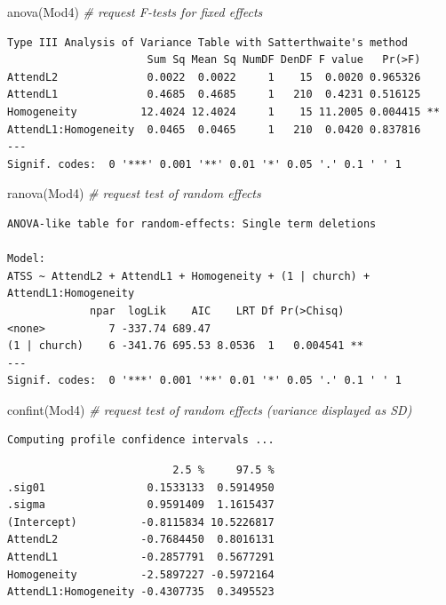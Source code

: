 \documentclass[
  11pt,
]{book}
\newenvironment{Shaded}{\begin{snugshade}}{\end{snugshade}}
\newcommand{\CommentTok}[1]{\textcolor[rgb]{0.56,0.35,0.01}{\textit{#1}}}
\newcommand{\FunctionTok}[1]{\textcolor[rgb]{0.00,0.00,0.00}{#1}}
\newcommand{\NormalTok}[1]{#1}
\begin{document}
\begin{Shaded}
\begin{Highlighting}[]
\FunctionTok{anova}\NormalTok{(Mod4) }\CommentTok{\# request F{-}tests for fixed effects}
\end{Highlighting}
\end{Shaded}

\begin{verbatim}
Type III Analysis of Variance Table with Satterthwaite's method
                      Sum Sq Mean Sq NumDF DenDF F value   Pr(>F)   
AttendL2              0.0022  0.0022     1    15  0.0020 0.965326   
AttendL1              0.4685  0.4685     1   210  0.4231 0.516125   
Homogeneity          12.4024 12.4024     1    15 11.2005 0.004415 **
AttendL1:Homogeneity  0.0465  0.0465     1   210  0.0420 0.837816   
---
Signif. codes:  0 '***' 0.001 '**' 0.01 '*' 0.05 '.' 0.1 ' ' 1
\end{verbatim}

\begin{Shaded}
\begin{Highlighting}[]
\FunctionTok{ranova}\NormalTok{(Mod4) }\CommentTok{\# request test of random effects}
\end{Highlighting}
\end{Shaded}

\begin{verbatim}
ANOVA-like table for random-effects: Single term deletions

Model:
ATSS ~ AttendL2 + AttendL1 + Homogeneity + (1 | church) + AttendL1:Homogeneity
             npar  logLik    AIC    LRT Df Pr(>Chisq)   
<none>          7 -337.74 689.47                        
(1 | church)    6 -341.76 695.53 8.0536  1   0.004541 **
---
Signif. codes:  0 '***' 0.001 '**' 0.01 '*' 0.05 '.' 0.1 ' ' 1
\end{verbatim}

\begin{Shaded}
\begin{Highlighting}[]
\FunctionTok{confint}\NormalTok{(Mod4) }\CommentTok{\# request test of random effects (variance displayed as SD)}
\end{Highlighting}
\end{Shaded}

\begin{verbatim}
Computing profile confidence intervals ...
\end{verbatim}

\begin{verbatim}
                          2.5 %     97.5 %
.sig01                0.1533133  0.5914950
.sigma                0.9591409  1.1615437
(Intercept)          -0.8115834 10.5226817
AttendL2             -0.7684450  0.8016131
AttendL1             -0.2857791  0.5677291
Homogeneity          -2.5897227 -0.5972164
AttendL1:Homogeneity -0.4307735  0.3495523
\end{verbatim}
\end{document}
